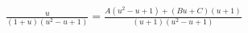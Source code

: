 \documentclass[preview]{standalone}
\begin{document}
\begin{align*}
\frac{u}{(1+u)(u^2-u+1)} = \frac{A(u^2-u+1)+(Bu+C)(u+1)}{(u+1)(u^2-u+1)}
\end{align*}
\end{document}
